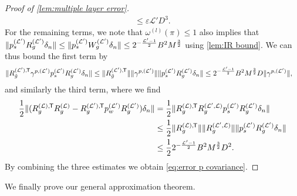 \documentclass[submission, Phys]{SciPost}
\theoremstyle{definition}
\theoremstyle{remark}
\DeclarePairedDelimiter{\norm}{\lVert}{\rVert}
\newcommand{\eps}{\varepsilon}
\newcommand{\cL}{\mathcal L}
\newcommand*{\tran}{{\mkern-1.5mu\mathsf{T}}}
\newcommand{\wnorm}{D}
\begin{document}
\begin{appendix}
\begin{proof}[Proof of \cref{lem:multiple layer error}]
\begin{equation*}
\begin{aligned}
\leq \eps \cL' \wnorm^3.
\end{aligned}\end{equation*}
For the remaining terms, we note that $\omega^{(l)}(\pi) \leq 1$ also implies that $\norm{p^{(\cL')}_s R^{(\cL')}_g \delta_n} \leq \norm{p^{(\cL')}_s W^{(\cL')}_g \delta_n} \leq 2^{-\frac{\cL' - 1}{2}} B^2 M^{\frac32}$ using \cref{lem:IR bound}.
We can thus bound the first term by
\begin{equation*}\begin{aligned}
  \norm{R^{(\cL'),\tran}_{\tilde g} \gamma^{p,(\cL')} p^{(\cL')}_s R_g^{(\cL')} \delta_n}
&\leq \norm{R^{(\cL'),\tran}_{\tilde g}} \norm{\gamma^{p,(\cL')}} \norm{p^{(\cL')}_s R_g^{(\cL')} \delta_n}
\leq 2^{-\frac{\cL' - 1}{2}} B^2 M^{\frac32} \wnorm \norm{\gamma^{p,(\cL')}},
\end{aligned}\end{equation*}
and similarly the third term, where we find
\begin{equation*}\begin{aligned}
  \frac12 \norm{(R_g^{(\cL),\tran} R_g^{(\cL)} - R^{(\cL'),\tran}_g p^{(\cL')}_w R_g^{(\cL')}) \delta_n}
&= \frac12 \norm{R_g^{(\cL),\tran} R_g^{(\cL',\cL)} p^{(\cL')}_s R_g^{(\cL')} \delta_n} \\
&\leq \frac12 \norm{R_g^{(\cL),\tran}} \norm{R_g^{(\cL',\cL)}} \norm{p^{(\cL')}_s R_g^{(\cL')} \delta_n} \\
&\leq \frac12 2^{-\frac{\cL' - 1}{2}} B^2 M^{\frac32} \wnorm^2.
\end{aligned}\end{equation*}
By combining the three estimates we obtain \cref{eq:error p covariance}.
\end{proof}

\noindent
We finally prove our general approximation theorem.


\end{appendix}
\end{document}
